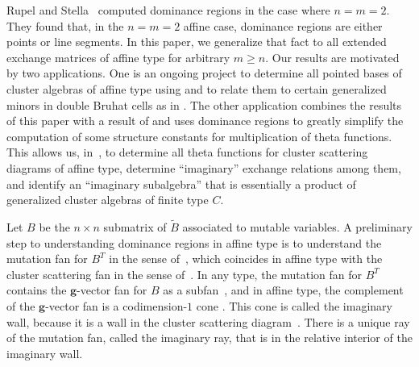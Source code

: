 \documentclass[10pt]{article}
\theoremstyle{definition}
\theoremstyle{remark}
\numberwithin{equation}{section}
\newcommand{\0}{{\mathbf{0}}}
\newcommand{\g}{\mathbf{g}}
\newcommand{\tB}{{\widetilde{B}}}
\begin{document}
Rupel and Stella~\cite{RSDom} computed dominance regions in the case where $n=m=2$. 
They found that, in the $n=m=2$ affine case, dominance regions are either points or line segments.
In this paper, we generalize that fact to all extended exchange matrices of affine type for arbitrary $m\ge n$.
Our results are motivated by two applications.  
One is an ongoing project to determine all pointed bases of cluster algebras of affine type using \cite[Theorem~1.2.1]{FanQin} and to relate them to certain generalized minors in double Bruhat cells as in \cite{RSW19}.
The other application combines the results of this paper with a result of \cite{canonical} and uses dominance regions to greatly simplify the computation of some structure constants for multiplication of theta functions.
This allows us, in~\cite{afftheta}, to determine all theta functions for cluster scattering diagrams of affine type, determine ``imaginary'' exchange relations among them, and identify an ``imaginary subalgebra'' that is essentially a product of generalized cluster algebras of finite type $C$.

Let $B$ be the $n\times n$ submatrix of $\widetilde B$ associated to mutable variables.
A preliminary step to understanding dominance regions in affine type is to understand the mutation fan for $B^T$ in the sense of~\cite{universal}, which coincides in affine type \mbox{\cite[Theorem~2.10]{affscat}} with the cluster scattering fan in the sense of~\cite{scatfan}.
In any type, the mutation fan for $B^T$ contains the $\g$-vector fan for $B$ as a subfan~\cite[Theorem~8.7]{universal}, and in affine type, the complement of the $\g$-vector fan is a codimension-$1$ cone \mbox{\cite[Corollaries~1.3, 4.9]{afframe}}.
This cone is called the imaginary wall, because it is a wall in the cluster scattering diagram~\cite{affscat}.
There is a unique ray of the mutation fan, called the imaginary ray, that is in the relative interior of the imaginary wall.  
\end{document}
